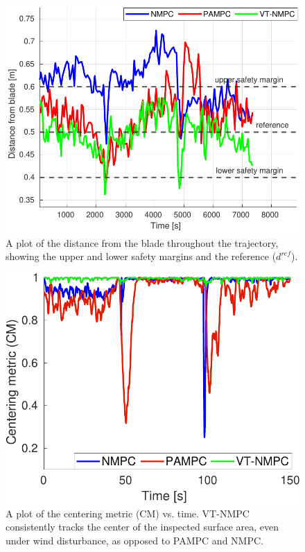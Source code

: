 
\begin{figure}[]
\centering
\includegraphics[width=.6\textwidth]{figures/distance_real.pdf}
\caption{A plot of the distance from the blade throughout the trajectory, showing the upper and lower safety margins and the reference ($d^{ref}$). }  \label{fig:distance_r}
\end{figure}


\begin{figure}[]
\centering
\includegraphics[width=.45\textwidth]{figures/cm.pdf}
\caption{A plot of the centering metric (CM) vs. time. VT-NMPC consistently tracks the center of the inspected surface area, even under wind disturbance, as opposed to PAMPC and NMPC.}  \label{fig:cm_r}
\end{figure}


